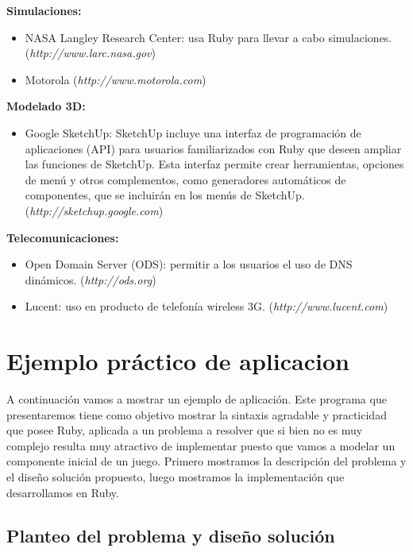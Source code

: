 \documentclass{article}
\begin{document}
\textbf{Simulaciones:}
\begin{itemize}
	\itemsep=1pt \topsep=0pt \partopsep=0pt \parskip=0pt \parsep=0pt
	\item NASA Langley Research Center: usa Ruby para llevar a cabo simulaciones. (\textit{http://www.larc.nasa.gov})
	\item Motorola (\textit{http://www.motorola.com})
\end{itemize}
\medskip

\textbf{Modelado 3D:}
\begin{itemize}
	\itemsep=1pt \topsep=0pt \partopsep=0pt \parskip=0pt \parsep=0pt
	\item Google SketchUp: SketchUp incluye una interfaz de programación de aplicaciones (API) para usuarios familiarizados con Ruby que deseen ampliar las funciones de SketchUp. Esta interfaz permite crear herramientas, opciones de menú y otros complementos, como generadores automáticos de componentes, que se incluirán en los menús de SketchUp. (\textit{http://sketchup.google.com})
\end{itemize}
\medskip

\textbf{Telecomunicaciones:}
\begin{itemize}
	\itemsep=1pt \topsep=0pt \partopsep=0pt \parskip=0pt \parsep=0pt
	\item Open Domain Server (ODS): permitir a los usuarios el uso de DNS dinámicos. (\textit{http://ods.org})
	\item Lucent: uso en producto de telefonía wireless 3G. (\textit{http://www.lucent.com})
\end{itemize}
\medskip
\bigskip




\section{Ejemplo práctico de aplicacion}


A continuación vamos a mostrar un ejemplo de aplicación. Este programa que presentaremos tiene como objetivo mostrar la sintaxis agradable y practicidad que posee Ruby, aplicada a un problema a resolver que si bien no es muy complejo resulta muy atractivo de implementar puesto que vamos a modelar un componente inicial de un juego. Primero mostramos la descripción del problema y el diseño solución propuesto, luego mostramos la implementación que desarrollamos en Ruby.

\subsection{Planteo del problema y diseño solución}
\end{document}
